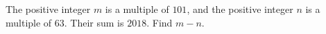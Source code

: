 The positive integer $m$ is a multiple of $101$, and the positive integer $n$ is a multiple of $63$. Their sum is $2018$. Find $m-n$.
